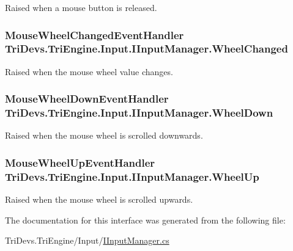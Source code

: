 Raised when a mouse button is released. 

\hypertarget{interface_tri_devs_1_1_tri_engine_1_1_input_1_1_i_input_manager_ab6fd3443048ee388a1e5624c2e7bba6d}{
\subsubsection[{Wheel\-Changed}]{\setlength{\rightskip}{0pt plus 5cm}Mouse\-Wheel\-Changed\-Event\-Handler Tri\-Devs.\-Tri\-Engine.\-Input.\-I\-Input\-Manager.\-Wheel\-Changed}}\label{interface_tri_devs_1_1_tri_engine_1_1_input_1_1_i_input_manager_ab6fd3443048ee388a1e5624c2e7bba6d}


Raised when the mouse wheel value changes. 

\hypertarget{interface_tri_devs_1_1_tri_engine_1_1_input_1_1_i_input_manager_ac5949fbd8ff7b44a239452df5e7bd0b9}{
\subsubsection[{Wheel\-Down}]{\setlength{\rightskip}{0pt plus 5cm}Mouse\-Wheel\-Down\-Event\-Handler Tri\-Devs.\-Tri\-Engine.\-Input.\-I\-Input\-Manager.\-Wheel\-Down}}\label{interface_tri_devs_1_1_tri_engine_1_1_input_1_1_i_input_manager_ac5949fbd8ff7b44a239452df5e7bd0b9}


Raised when the mouse wheel is scrolled downwards. 

\hypertarget{interface_tri_devs_1_1_tri_engine_1_1_input_1_1_i_input_manager_a7ff29af67407f381c5d7e23ced4c2b21}{
\subsubsection[{Wheel\-Up}]{\setlength{\rightskip}{0pt plus 5cm}Mouse\-Wheel\-Up\-Event\-Handler Tri\-Devs.\-Tri\-Engine.\-Input.\-I\-Input\-Manager.\-Wheel\-Up}}\label{interface_tri_devs_1_1_tri_engine_1_1_input_1_1_i_input_manager_a7ff29af67407f381c5d7e23ced4c2b21}


Raised when the mouse wheel is scrolled upwards. 



The documentation for this interface was generated from the following file\-:\begin{DoxyCompactItemize}
\item 
Tri\-Devs.\-Tri\-Engine/\-Input/\hyperlink{_i_input_manager_8cs}{I\-Input\-Manager.\-cs}\end{DoxyCompactItemize}
